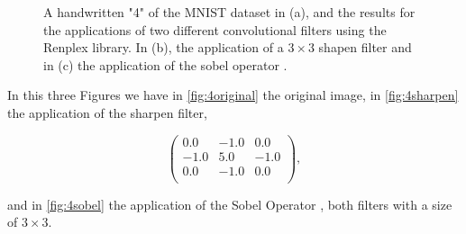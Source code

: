 \begin{figure}[htbp]
	\centering
	\caption{A handwritten "4" of the MNIST dataset in (a), and the results for the applications of two different convolutional filters using the Renplex library. In (b), the application of a $ 3 \times 3 $ shapen filter and in (c) the application of the sobel operator \parencite{sobel2014operator}.}
	\label{fig:4conv}
\end{figure}

In this three Figures we have in \ref{fig:4original} the original image, in \ref{fig:4sharpen} the application of the sharpen filter,

\[
\begin{pmatrix}
	0.0 & -1.0 & 0.0 \\
	-1.0 & 5.0 & -1.0 \\
	0.0 & -1.0 & 0.0 \\
\end{pmatrix},
\]

and in \ref{fig:4sobel} the application of the Sobel Operator \parencite{sobel1968}, both filters with a size of $ 3 \times 3 $. 

